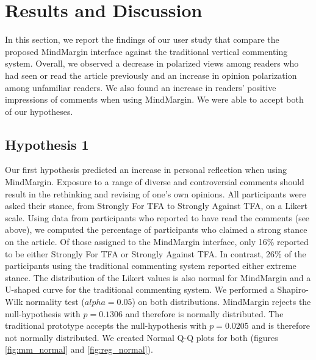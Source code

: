 \section{Results and Discussion}

In this section, we report the findings of our user study that compare the proposed MindMargin interface against the traditional vertical commenting system. Overall, we observed a decrease in polarized views among readers who had seen or read the article previously and an increase in opinion polarization among unfamiliar readers. We also found an increase in readers' positive impressions of comments when using MindMargin. We were able to accept both of our hypotheses.

\subsection{Hypothesis 1}
Our first hypothesis predicted an increase in personal reflection when using MindMargin. Exposure to a range of diverse and controversial comments should result in the rethinking and revising of one’s own opinions. All participants were asked their stance, from Strongly For TFA to Strongly Against TFA, on a Likert scale. Using data from participants who reported to have read the comments (see above), we computed the percentage of participants who claimed a strong stance on the article. Of those assigned to the MindMargin interface, only 16\% reported to be either Strongly For TFA or Strongly Against TFA. In contrast, 26\% of the participants using the traditional commenting system reported either extreme stance. The distribution of the Likert values is also normal for MindMargin and a U-shaped curve for the traditional commenting system. We performed a Shapiro-Wilk normality test ($alpha=0.05$) on both distributions. MindMargin rejects the null-hypothesis with $p=0.1306$ and therefore is normally distributed. The traditional prototype accepts the null-hypothesis with $p=0.0205$ and is therefore not normally distributed. We created Normal Q-Q plots for both (figures \ref{fig:mm_normal} and \ref{fig:reg_normal}).

